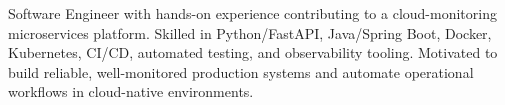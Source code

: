 \par{
Software Engineer with hands-on experience contributing to a cloud-monitoring microservices platform. Skilled in Python/FastAPI, Java/Spring Boot, Docker, Kubernetes, CI/CD, automated testing, and observability tooling. Motivated to build reliable, well-monitored production systems and automate operational workflows in cloud-native environments.
}
